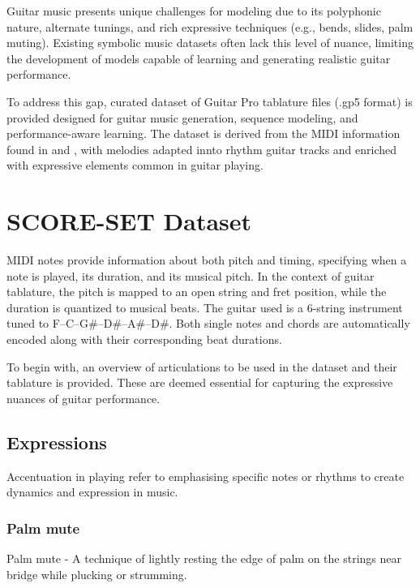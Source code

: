 \documentclass[twoside,11pt]{article}
\begin{document}
Guitar music presents unique challenges for 
modeling due to its polyphonic nature, alternate tunings, and rich 
expressive techniques (e.g., bends, slides, palm muting). Existing symbolic 
music datasets often lack this level of nuance, limiting the development of 
models capable of learning and generating realistic guitar performance.

To address this gap, curated dataset of Guitar Pro tablature files (.gp5 format) is provided 
designed for guitar music generation, sequence modeling, and performance-aware learning. 
The dataset is derived from the MIDI information found in \cite{hawthorne2018enabling} and 
\cite{kong2022giantmidipianolargescalemididataset}, with melodies adapted innto 
rhythm guitar tracks and enriched with expressive elements common in guitar playing.
\section{SCORE-SET Dataset}
MIDI notes provide information about both pitch and timing, specifying when 
a note is played, its duration, and its musical pitch. 
In the context of guitar tablature, the pitch is mapped to an open string and 
fret position, while the duration is quantized to musical beats. The guitar used is a 6-string instrument tuned to F--C--G\#--D\#--A\#--D\#. 
Both single notes and chords are automatically encoded along with their corresponding beat durations.

To begin with, an overview of articulations to be used in 
the dataset and their tablature is provided. These are deemed essential for capturing the expressive nuances of 
guitar performance.
\subsection{Expressions}
Accentuation in playing refer to emphasising specific notes or rhythms to create dynamics and expression in music. 
\subsubsection{Palm mute}
Palm mute - A technique of lightly resting the edge of palm on the strings near bridge while plucking or strumming.
\end{document}
